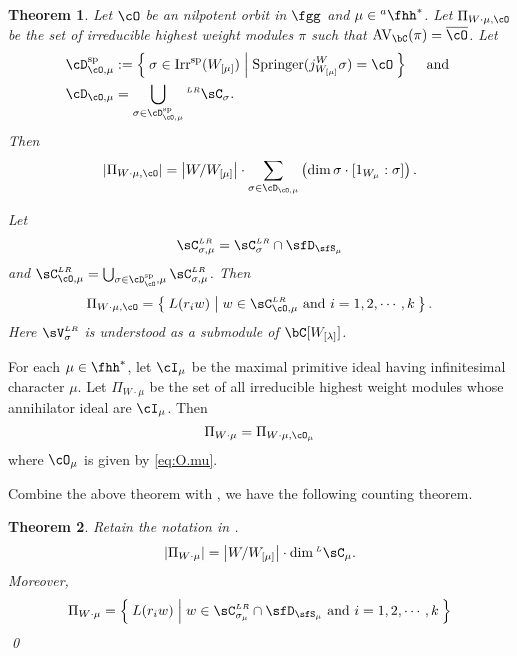 \documentclass[12pt,a4paper]{amsart}
\newcommand{\AVC}{\mathrm{AV}_\bC}
\def\abs#1{\left|{#1}\right|}
\numberwithin{equation}{section}
\newtheorem{thm}{Theorem}[section]
\theoremstyle{remark}
\def\Irrsp{\mathrm{Irr}^{\text{sp}}}
\def\hha{{}^a\fhh}
\def\ahh{\hha}
\def\Wlam{W_{[\lambda]}}
\def\CLR{{\sC}^{\scriptscriptstyle LR}}
\def\LC{{}^{\scriptscriptstyle L}\sC}
\def\LRC{{}^{\scriptscriptstyle LR}\sC}
\def\VLR{{\sV}^{\scriptscriptstyle LR}}
\def\Spr{\mathrm{Springer}}
\def\Dsp{\cD^{\text{sp}}}
\begin{document}
\begin{thm}
  Let $\cO$ be an nilpotent orbit in $\fgg$ and $\mu\in \ahh^{*}$. Let
  $\Pi_{W\cdot \mu, \cO}$ be the set of irreducible highest weight modules $\pi$
  such that $\AVC(\pi) = \bcO$. Let
  \begin{equation}\label{eq:DC.O.mu}
    \begin{split}
      \Dsp_{\cO,\mu} &:= \Set{\sigma\in \Irrsp(W_{[\mu]})|\Spr(j_{W_{[\mu]}}^{W}\sigma) = \cO}\quad \text{
        and }\\
      \cD_{\cO,\mu} &= \bigcup_{\sigma\in \Dsp_{\cO,\mu}} \LRC_{\sigma}.
    \end{split}
  \end{equation}
  Then
  \[
    \abs{\Pi_{W\cdot\mu,\cO}} = \abs{W/W_{[\mu]}}\cdot \sum_{\sigma\in \cD_{\cO,\mu}} \left(\dim \sigma \cdot [1_{W_{\mu}}:\sigma]\right).
  \]


  Let
  \[
    \CLR_{\sigma,\mu} = \CLR_{\sigma}\cap \sfD_{\sfS_{\mu}}
  \]
  and $\CLR_{\cO,\mu} = \bigcup_{\sigma\in \Dsp_{\cO},\mu} \CLR_{\sigma,\mu}$. Then
  \[
    \Pi_{W\cdot\mu,\cO} = \Set{L(r_{i}w)|w\in \CLR_{\cO,\mu} \text{ and
      } i=1,2,\cdots,k} .
  \]
  Here $\VLR_{\sigma}$ is understood as a submodule of $\bC[\Wlam]$.
\end{thm}



For each $\mu\in \fhh^{*}$, let $\cI_{\mu}$ be the maximal primitive ideal
having infinitesimal character $\mu$. Let $\Pi_{W\cdot \mu}$ be the set of all
irreducible highest weight modules whose annihilator ideal are $\cI_{\mu}$. Then
\[
  \Pi_{W\cdot \mu} = \Pi_{W\cdot \mu, \cO_{\mu}}
\]
where $\cO_{\mu}$ is given by \eqref{eq:O.mu}.


Combine the above theorem with , we have the following
counting theorem.
\begin{thm}
  Retain the notation in
  .
  \[ \abs{\Pi_{W\cdot \mu}} = \abs{W/W_{[\mu]}}\cdot \dim \LC_{\mu}.
  \]
  Moreover,
  \[
    \Pi_{W\cdot\mu} = \Set{L(r_{i}w)|w\in \CLR_{\sigma_{\mu}}\cap \sfD_{\sfS_{\mu}} \text{
        and } i=1,2,\cdots,k}
  \]
  \qed
\end{thm}
\end{document}

